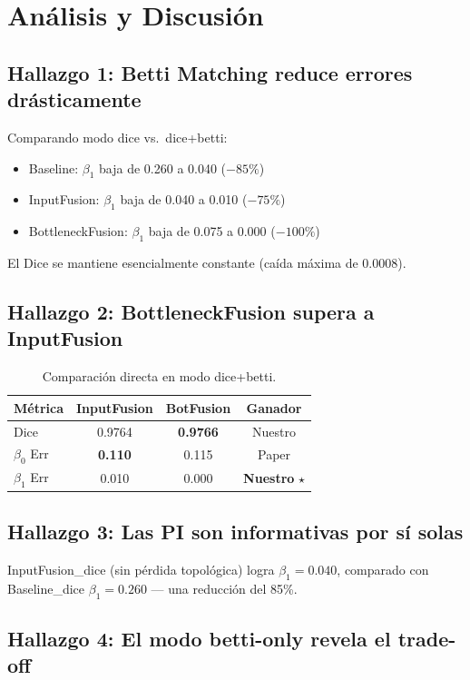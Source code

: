 \documentclass[10pt,twocolumn]{article}
\begin{document}
\section{Análisis y Discusión}

\subsection{Hallazgo 1: Betti Matching reduce errores drásticamente}

Comparando modo dice vs.\ dice+betti:
\begin{itemize}[noitemsep]
\item Baseline: $\beta_1$ baja de 0.260 a 0.040 ($-85\%$)
\item InputFusion: $\beta_1$ baja de 0.040 a 0.010 ($-75\%$)
\item BottleneckFusion: $\beta_1$ baja de 0.075 a 0.000 ($-100\%$)
\end{itemize}
El Dice se mantiene esencialmente constante (caída máxima de 0.0008).

\subsection{Hallazgo 2: BottleneckFusion supera a InputFusion}

\begin{table}[H]
\centering
\caption{Comparación directa en modo dice+betti.}
\label{tab:headtohead}
\begin{tabular}{lccc}
\toprule
\textbf{Métrica} & \textbf{InputFusion} & \textbf{BotFusion} & \textbf{Ganador} \\
\midrule
Dice & 0.9764 & \textbf{0.9766} & Nuestro \\
$\beta_0$ Err & \textbf{0.110} & 0.115 & Paper \\
$\beta_1$ Err & 0.010 & $\mathbf{0.000}$ & \textbf{Nuestro} $\star$ \\
\bottomrule
\end{tabular}
\end{table}

\subsection{Hallazgo 3: Las PI son informativas por sí solas}

InputFusion\_dice (sin pérdida topológica) logra $\beta_1 = 0.040$, comparado con Baseline\_dice $\beta_1 = 0.260$ --- una reducción del 85\%.

\subsection{Hallazgo 4: El modo betti-only revela el trade-off}
\end{document}
